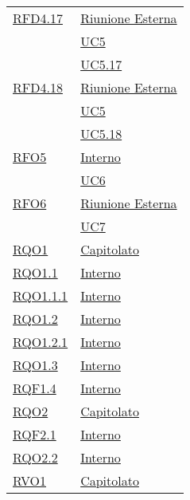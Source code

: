 \begin{longtable}{|>{\centering}m{5cm}|m{5cm}<{\centering}|}
\hyperlink{RFD4.17}{RFD4.17} & \hyperlink{Riunione Esterna}{Riunione Esterna}\\
& \hyperref[UC5]{UC5}\\
& \hyperref[UC5.17]{UC5.17}\\ \hline

\hyperlink{RFD4.18}{RFD4.18} & \hyperlink{Riunione Esterna}{Riunione Esterna}\\
& \hyperref[UC5]{UC5}\\
& \hyperref[UC5.18]{UC5.18}\\ \hline

\hyperlink{RFO5}{RFO5} & \hyperlink{Interno}{Interno}\\
& \hyperref[UC6]{UC6}\\ \hline

\hyperlink{RFO6}{RFO6} & \hyperlink{Riunione Esterna}{Riunione Esterna}\\
& \hyperref[UC7]{UC7}\\ \hline

\hyperlink{RQO1}{RQO1} & \hyperlink{Capitolato}{Capitolato}\\ \hline

\hyperlink{RQO1.1}{RQO1.1} & \hyperlink{Interno}{Interno}\\ \hline

\hyperlink{RQO1.1.1}{RQO1.1.1} & \hyperlink{Interno}{Interno}\\ \hline

\hyperlink{RQO1.2}{RQO1.2} & \hyperlink{Interno}{Interno}\\ \hline

\hyperlink{RQO1.2.1}{RQO1.2.1} & \hyperlink{Interno}{Interno}\\ \hline

\hyperlink{RQO1.3}{RQO1.3} & \hyperlink{Interno}{Interno}\\ \hline

\hyperlink{RQF1.4}{RQF1.4} & \hyperlink{Interno}{Interno}\\ \hline

\hyperlink{RQO2}{RQO2} & \hyperlink{Capitolato}{Capitolato}\\ \hline

\hyperlink{RQF2.1}{RQF2.1} & \hyperlink{Interno}{Interno}\\ \hline

\hyperlink{RQO2.2}{RQO2.2} & \hyperlink{Interno}{Interno}\\ \hline

\hyperlink{RVO1}{RVO1} & \hyperlink{Capitolato}{Capitolato}\\ \hline


\end{longtable}
